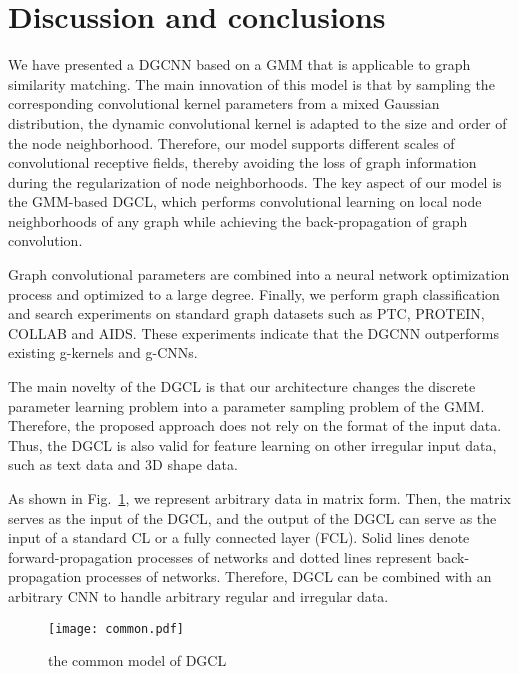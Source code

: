 \documentclass[11pt]{article}
\begin{document}
\section{Discussion and conclusions}

We have presented a DGCNN based on a GMM that is applicable to graph similarity matching. The main innovation of this model is that by sampling the corresponding convolutional kernel parameters from a mixed Gaussian distribution, the dynamic convolutional kernel is adapted to the size and order of the node neighborhood. Therefore, our model supports different scales of convolutional receptive fields, thereby avoiding the loss of graph information during the regularization of node neighborhoods. The key aspect of our model is the GMM-based DGCL, which performs convolutional learning on local node neighborhoods of any graph while achieving the back-propagation of graph convolution.

Graph convolutional parameters are combined into a neural network optimization process and optimized to a large degree. Finally, we perform graph classification and search experiments on standard graph datasets such as PTC, PROTEIN, COLLAB and AIDS. These experiments indicate that the DGCNN outperforms existing g-kernels and g-CNNs.

The main novelty of the DGCL is that our architecture changes the discrete parameter learning problem into a parameter sampling problem of the GMM. Therefore, the proposed approach does not rely on the format of the input data. Thus, the DGCL is also valid for feature learning on other irregular input data, such as text data and 3D shape data.


As shown in Fig.~\ref{fig:common}, we represent arbitrary data in matrix form. Then, the matrix serves as the input of the DGCL, and the output of the DGCL can serve as the input of a standard CL or a fully connected layer (FCL). Solid lines denote forward-propagation processes of networks and dotted lines represent back-propagation processes of networks. Therefore, DGCL can be combined with an arbitrary CNN to handle arbitrary regular and irregular data.



\begin{figure}
\vspace{-0.1in}
\centering
\texttt{[image: common.pdf]}
\vspace{-0.1in}
\caption{the common model of DGCL}\label{fig:common}
\vspace{-0.2in}
\end{figure}


\end{document}
